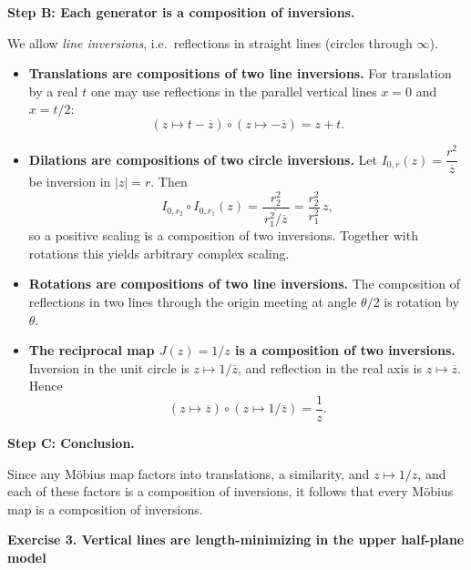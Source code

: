 \begin{solution}
\par\medskip\noindent\textbf{\textbf{Step B: Each generator is a composition of inversions.}}\par\smallskip

We allow \emph{line inversions}, i.e.\ reflections in straight lines (circles through $\infty$).

\begin{itemize}
	\item \textbf{Translations are compositions of two line inversions.}
	For translation by a real $t$ one may use reflections in the parallel vertical lines $x=0$ and $x=t/2$:
	\[
	(z\mapsto t-\overline{z})\circ(z\mapsto -\overline{z}) = z+t.
	\]
	
	\item \textbf{Dilations are compositions of two circle inversions.}
	Let $I_{0,r}(z)=\dfrac{r^2}{\overline{z}}$ be inversion in $|z|=r$. Then
	\[
	I_{0,r_2}\circ I_{0,r_1}(z)
	=\frac{r_2^2}{\overline{\,r_1^2/\overline{z}\,}}
	=\frac{r_2^2}{r_1^2}\,z,
	\]
	so a positive scaling is a composition of two inversions. Together with rotations this yields arbitrary complex scaling.
	
	\item \textbf{Rotations are compositions of two line inversions.}
	The composition of reflections in two lines through the origin meeting at angle $\theta/2$ is rotation by $\theta$.
	
	\item \textbf{The reciprocal map $J(z)=1/z$ is a composition of two inversions.}
	Inversion in the unit circle is $z\mapsto 1/\overline{z}$, and reflection in the real axis is $z\mapsto \overline{z}$. Hence
	\[
	(z\mapsto \overline{z})\circ(z\mapsto 1/\overline{z})=\frac{1}{z}.
	\]
\end{itemize}

\par\medskip\noindent\textbf{\textbf{Step C: Conclusion.}}\par\smallskip

Since any M\"{o}bius map factors into translations, a similarity, and $z\mapsto 1/z$, and each of these factors is a composition of inversions, it follows that every M\"{o}bius map is a composition of inversions.





\par\medskip\noindent\textbf{\textbf{Exercise 3. Vertical lines are length-minimizing in the upper half-plane model}}\par\smallskip



\end{solution}
